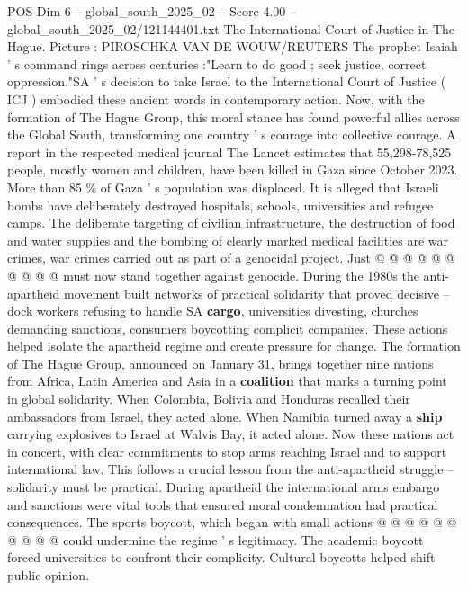 \begin{textsample}{POS Dim 6 – global\_south\_2025\_02 – Score 4.00 – global\_south\_2025\_02/121144401.txt}  \label{ex:f6_pos_408}
The International Court of Justice in The Hague.
Picture : PIROSCHKA VAN DE WOUW/REUTERS The prophet Isaiah ' s command rings across centuries :"Learn to do good ; seek justice, correct oppression."SA ' s decision to take Israel to the International Court of Justice ( ICJ ) embodied these ancient words in contemporary action.
Now, with the formation of The Hague Group, this moral stance has found powerful allies across the Global South, transforming one country ' s courage into collective courage.
A report in the respected medical journal The Lancet estimates that 55,298-78,525 people, mostly women and children, have been killed in Gaza since October 2023.
More than 85 \% of Gaza ' s population was displaced.
It is alleged that Israeli bombs have deliberately destroyed hospitals, schools, universities and refugee camps.
The deliberate targeting of civilian infrastructure, the destruction of food and water supplies and the bombing of clearly marked medical facilities are war crimes, war crimes carried out as part of a genocidal project.
Just @ @ @ @ @ @ @ @ @ @ must now stand together against genocide.
During the 1980s the anti-apartheid movement built networks of practical solidarity that proved decisive -- dock workers refusing to handle SA \textbf{cargo}, universities divesting, churches demanding sanctions, consumers boycotting complicit companies.
These actions helped isolate the apartheid regime and create pressure for change.
The formation of The Hague Group, announced on January 31, brings together nine nations from Africa, Latin America and Asia in a \textbf{coalition} that marks a turning point in global solidarity.
When Colombia, Bolivia and Honduras recalled their ambassadors from Israel, they acted alone.
When Namibia turned away a \textbf{ship} carrying explosives to Israel at Walvis Bay, it acted alone.
Now these nations act in concert, with clear commitments to stop arms reaching Israel and to support international law.
This follows a crucial lesson from the anti-apartheid struggle -- solidarity must be practical.
During apartheid the international arms embargo and sanctions were vital tools that ensured moral condemnation had practical consequences.
The sports boycott, which began with small actions @ @ @ @ @ @ @ @ @ @ could undermine the regime ' s legitimacy.
The academic boycott forced universities to confront their complicity.
Cultural boycotts helped shift public opinion.

\end{textsample}
